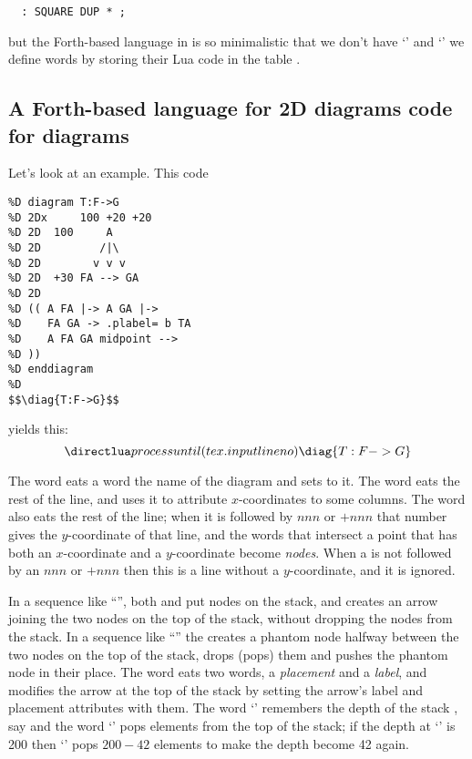 \documentclass{ltugboat}
\begin{document}
\begin{verbatim}
  : SQUARE DUP * ;
\end{verbatim}
%
but the Forth-based language in  is so minimalistic that we
don't have `\co{:}' and `\co{;}' \Dash we define words by storing their
Lua code in the table .



%                                       
\subsection{A Forth-based language for 2D diagrams \Dash code for diagrams}
\label{2D-code}

Let's look at an example. This code
%

\begin{verbatim}
%D diagram T:F->G
%D 2Dx     100 +20 +20
%D 2D  100     A
%D 2D         /|\
%D 2D        v v v
%D 2D  +30 FA --> GA
%D 2D
%D (( A FA |-> A GA |->
%D    FA GA -> .plabel= b TA
%D    A FA GA midpoint -->
%D ))
%D enddiagram
%D
$$\diag{T:F->G}$$
\end{verbatim}
%
yields this:
%
$$\pu
  \diag{T:F->G}
$$

The word  eats a word \Dash the name of the diagram \Dash and
sets  to it. The word  eats the rest of the
line, and uses it to attribute $x$-coordinates to some columns. The
word  also eats the rest of the line; when it is followed by
$nnn$ or $+nnn$ that number gives the $y$-coordinate of that line, and
the words that intersect a point that has both an $x$-coordinate and a
$y$-coordinate become {\sl nodes}. When a  is not followed by
an $nnn$ or $+nnn$ then this is a line without a $y$-coordinate, and
it is ignored.

In a sequence like ``'', both  and  put nodes
on the stack, and \co{|->} creates an arrow joining the two nodes on
the top of the stack, without dropping the nodes from the stack. In a
sequence like ``'' the  creates a
phantom node halfway between the two nodes on the top of the stack,
drops (pops) them and pushes the phantom node in their place. The word
 eats two words, a {\sl placement} and a {\sl label}, and
modifies the arrow at the top of the stack by setting the arrow's
label and placement attributes with them. The word `\co{((}' remembers
the depth of the stack , say \Dash and the word `\co{))}' pops
elements from the top of the stack; if the depth at `\co{))}' is 200
then `\co{))}' pops $200-42$ elements to make the depth become 42
again.
\end{document}
